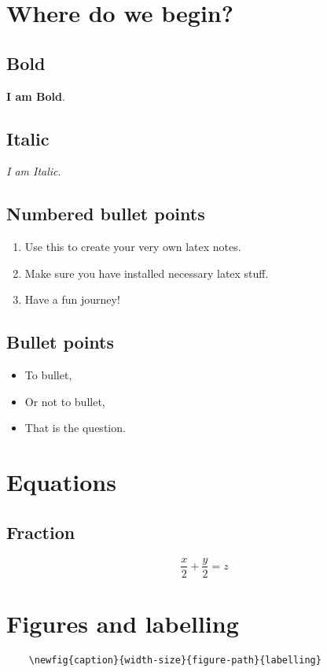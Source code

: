 \section{Where do we begin?}

\subsection*{Bold}

\textbf{I am Bold}.

\subsection*{Italic}

\textit{I am Italic}.

\subsection*{Numbered bullet points}
\begin{enumerate}
    \item Use this to create your very own latex notes.
    \item Make sure you have installed necessary latex stuff.
    \item Have a fun journey!
\end{enumerate}

\subsection*{Bullet points}
\begin{itemize}
    \item To bullet,
    \item Or not to bullet,
    \item That is the question.
\end{itemize}


\section{Equations}

\subsection{Fraction}

\begin{equation}
    \frac{x}{2}+\frac{y}{2}=z
\end{equation}

\section{Figures and labelling}
\begin{verbatim}
    \newfig{caption}{width-size}{figure-path}{labelling}
\end{verbatim}

